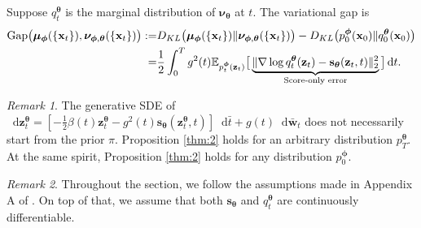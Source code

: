 \documentclass{article}
\theoremstyle{definition}
\theoremstyle{remark}
\newtheorem{remark}{Remark}
\newcommand*\diff{\mathop{}\!\mathrm{d}}
\begin{document}
	\begin{proposition}\label{thm:2}
		Suppose $q_{t}^{\bm{\theta}}$ is the marginal distribution of $\bm{\nu}_{\bm{\theta}}$ at $t$. The variational gap is
		\begin{align*}
		\textup{Gap}\big(\bm{\mu}_{\bm{\phi}}(\{\mathbf{x}_{t}\}),\bm{\nu}_{\bm{\phi},\bm{\theta}}(\{\mathbf{x}_{t}\})\big):=&D_{KL}\big(\bm{\mu}_{\bm{\phi}}(\{\mathbf{x}_{t}\})\Vert\bm{\nu}_{\bm{\phi},\bm{\theta}}(\{\mathbf{x}_{t}\})\big)-D_{KL}\big(p_{0}^{\bm{\phi}}(\mathbf{x}_{0})\Vert q_{0}^{\bm{\theta}}(\mathbf{x}_{0})\big)\\
		=&\frac{1}{2}\int_{0}^{T}g^{2}(t)\mathbb{E}_{p_{t}^{\bm{\phi}}(\mathbf{z}_{t})}\big[\underbrace{\Vert\nabla\log{q_{t}^{\bm{\theta}}(\mathbf{z}_{t})}-\mathbf{s}_{\bm{\theta}}(\mathbf{z}_{t},t)\Vert_{2}^{2}}_{\text{Score-only error}}\big]\diff t.
		\end{align*}
	\end{proposition}
	
	\begin{remark}
		The generative SDE of $\diff\mathbf{z}_{t}^{\bm{\theta}}=[-\frac{1}{2}\beta(t)\mathbf{z}_{t}^{\bm{\theta}}-g^{2}(t)\mathbf{s}_{\bm{\theta}}(\mathbf{z}_{t}^{\bm{\theta}},t)]\diff\bar{t}+g(t)\diff\mathbf{\bar{w}}_{t}$ does not necessarily start from the prior $\pi$. Proposition \ref{thm:2} holds for an arbitrary distribution $p_{T}^{\bm{\theta}}$. At the same spirit, Proposition \ref{thm:2} holds for any distribution $p_{0}^{\bm{\phi}}$.
	\end{remark}
	\begin{remark}
		Throughout the section, we follow the assumptions made in Appendix A of \citet{song2021maximum}. On top of that, we assume that both $\mathbf{s}_{\bm{\theta}}$ and $q_{t}^{\bm{\theta}}$ are continuously differentiable.
	\end{remark}
	
\end{document}
